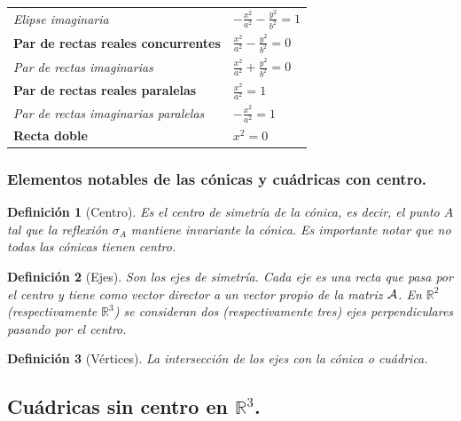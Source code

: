 \documentclass[11pt, a4paper]{article}
\newif\IfInSansMode
\theoremstyle{theorem-style}
\theoremstyle{definition-style}
\newtheorem{ndef}{Definición}[section]
\theoremstyle{remark-style}
\theoremstyle{example-style}
\begin{document}
\vspace{.8cm}

\begin{tabular}{ll}
{\it Elipse imaginaria}  &
$
-\frac{{x}^2}{a^2} - \frac{{y}^2}{b^2} = 1
$
\vspace{.4cm}
\\

{\bf  Par de rectas reales concurrentes}  &
$
\frac{{x}^2}{a^2} - \frac{{y}^2}{b^2}=0
$
\vspace{.4cm}
\\
{\it Par de rectas imaginarias} &
$
\frac{{x}^2}{a^2} + \frac{{y}^2}{b^2}=0
$
\vspace{.4cm}
\\
{\bf  Par de rectas reales paralelas}  &
$
\frac{{x}^2}{a^2}=1
$
\vspace{.4cm}
\\
{\it Par de rectas imaginarias paralelas}  &
$
-\frac{{x}^2}{a^2} = 1
$
\vspace{.4cm}
\\
{\bf  Recta doble}  &
$
{{x}^2} = 0
$
\vspace{.3cm}
\\
\end{tabular}
\subsubsection{\bf  Elementos notables de las c\'onicas y cu\'adricas con centro.}

\begin{ndef}[Centro]
	Es el centro de simetría de la cónica, es decir, el punto $A$ tal que la reflexión $\sigma_A$ mantiene invariante la cónica. Es importante notar que no todas las cónicas tienen centro.
\end{ndef}


\begin{ndef}[Ejes]
	 Son los ejes de simetr\'ia. Cada eje es una recta que pasa por el centro y tiene como vector director a un vector propio de la matriz $\cal A$. En $\mathbb{R}^2$ (respectivamente $\mathbb{R}^3$) se consideran dos (respectivamente tres)  ejes perpendiculares pasando por el centro.
\end{ndef}

\begin{ndef}[Vértices]
	La intersecci\'on de los ejes con la c\'onica o cu\'adrica.
\end{ndef}


\subsection{\bf Cu\'adricas sin centro en $\mathbb{R}^3$.}
\end{document}

